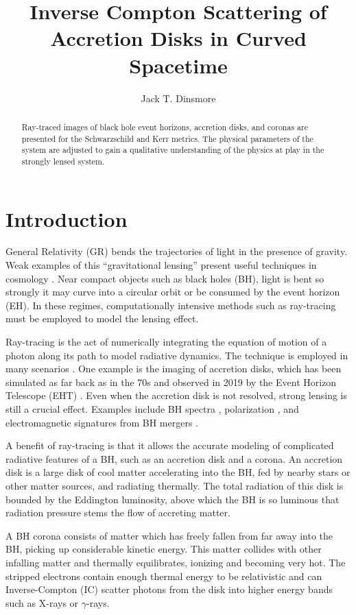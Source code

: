 \documentclass[twocolumn,twocolappendix]{aastex631}
\begin{document}
\author{Jack T. Dinsmore}
\title{Inverse Compton Scattering of Accretion Disks in Curved Spacetime}

\begin{abstract}
  Ray-traced images of black hole event horizons, accretion disks, and coronas are presented for the Schwarzschild and Kerr metrics. The physical parameters of the system are adjusted to gain a qualitative understanding of the physics at play in the strongly lensed system.
\end{abstract}

\section{Introduction}

General Relativity (GR) bends the trajectories of light in the presence of gravity. Weak examples of this ``gravitational lensing'' present useful techniques in cosmology \citep{blandford1992cosmological}. Near compact objects such as black holes (BH), light is bent so strongly it may curve into a circular orbit or be consumed by the event horizon (EH). In these regimes, computationally intensive methods such as ray-tracing must be employed to model the lensing effect.

Ray-tracing is the act of numerically integrating the equation of motion of a photon along its path to model radiative dynamics. The technique is employed in many scenarios \citep{vincent2011gyoto}. One example is the imaging of accretion disks, which has been simulated as far back as in the 70s \citep{luminet1979image} and observed in 2019 by the Event Horizon Telescope (EHT) \citep{collaboration2019first}. Even when the accretion disk is not resolved, strong lensing is still a crucial effect. Examples include BH spectra \citep{cunningham1975effects}, polarization \citep{dovvciak2008thermal}, and electromagnetic signatures from BH mergers \citep{d2018electromagnetic}.

A benefit of ray-tracing is that it allows the accurate modeling of complicated radiative features of a BH, such as an accretion disk and a corona. An accretion disk is a large disk of cool matter accelerating into the BH, fed by nearby stars or other matter sources, and radiating thermally. The total radiation of this disk is bounded by the Eddington luminosity, above which the BH is so luminous that radiation pressure stems the flow of accreting matter.

A BH corona consists of matter which has freely fallen from far away into the BH, picking up considerable kinetic energy. This matter collides with other infalling matter and thermally equilibrates, ionizing and becoming very hot. The stripped electrons contain enough thermal energy to be relativistic and can Inverse-Compton (IC) scatter photons from the disk into higher energy bands such as X-rays or $\gamma$-rays.
\end{document}
